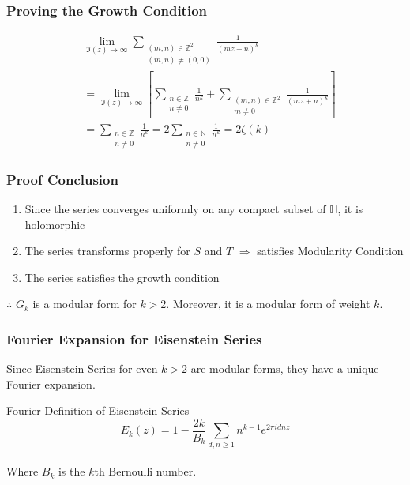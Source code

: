 \documentclass{beamer}
\begin{document}
\begin{frame}
\frametitle{Proving the Growth Condition}
\begin{align*}
& \lim_{\Im(z) \to \infty} \sum_{\substack{(m,n) \in \mathbb{Z}^2 \\ (m,n) \neq (0,0)}}  \frac{1}{(m z + n)^k} \\
& = \lim_{\Im(z) \to \infty} \left[ \sum_{\substack{n \in \mathbb{Z} \\ n \neq 0}} \frac{1}{n^k} + \sum_{\substack{(m,n) \in \mathbb{Z}^2 \\ m \neq 0}}  \frac{1}{(m z + n)^k} \right] \\
& = \sum_{\substack{n \in \mathbb{Z} \\ n \neq 0}} \frac{1}{n^k} = 2 \sum_{\substack{n \in \mathbb{N} \\ n \neq 0}} \frac{1}{n^k}  = 2\zeta(k)
\end{align*}
\end{frame}

\begin{frame}
\frametitle{Proof Conclusion}
\begin{enumerate}
\item Since the series converges uniformly on any compact subset of $\mathbb{H}$, it is holomorphic
\item The series transforms properly for $S$ and $T$ $\Rightarrow$ satisfies Modularity Condition
\item The series satisfies the growth condition
\end{enumerate}


$\therefore$ $G_k$ is a modular form for $k > 2$. Moreover, it is a modular form of weight $k$.

\end{frame}

\begin{frame}
\frametitle{Fourier Expansion for Eisenstein Series}
Since Eisenstein Series for even $k>2$ are modular forms, they have a unique Fourier expansion. 
\begin{block}{Fourier Definition of Eisenstein Series}
$$E_k(z) = 1 - \frac{2k}{B_k} \sum_{d,n \geq 1} n^{k-1} e^{2\pi i dnz} $$\\
Where $B_k$ is the $k$th Bernoulli number.
\end{block}
\end{frame}
\end{document}
